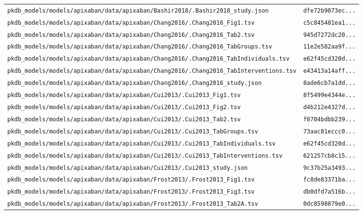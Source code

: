 \documentclass{article}
\begin{document}
\begin{longtable}{ll}
\texttt{pkdb\_models/models/apixaban/data/apixaban/Bashir2018/.Bashir2018\_study.json} & \texttt{dfe72b9073ec...} \\
\texttt{pkdb\_models/models/apixaban/data/apixaban/Chang2016/.Chang2016\_Fig1.tsv} & \texttt{c5c845481ea1...} \\
\texttt{pkdb\_models/models/apixaban/data/apixaban/Chang2016/.Chang2016\_Tab2.tsv} & \texttt{945d7272dc20...} \\
\texttt{pkdb\_models/models/apixaban/data/apixaban/Chang2016/.Chang2016\_TabGroups.tsv} & \texttt{11e2e582aa9f...} \\
\texttt{pkdb\_models/models/apixaban/data/apixaban/Chang2016/.Chang2016\_TabIndividuals.tsv} & \texttt{e62f45cd320d...} \\
\texttt{pkdb\_models/models/apixaban/data/apixaban/Chang2016/.Chang2016\_TabInterventions.tsv} & \texttt{e43413a14aff...} \\
\texttt{pkdb\_models/models/apixaban/data/apixaban/Chang2016/.Chang2016\_study.json} & \texttt{8ade6cb7a1dd...} \\
\texttt{pkdb\_models/models/apixaban/data/apixaban/Cui2013/.Cui2013\_Fig1.tsv} & \texttt{8f5499e4344e...} \\
\texttt{pkdb\_models/models/apixaban/data/apixaban/Cui2013/.Cui2013\_Fig2.tsv} & \texttt{d4b212e4327d...} \\
\texttt{pkdb\_models/models/apixaban/data/apixaban/Cui2013/.Cui2013\_Tab2.tsv} & \texttt{f0704bdbb239...} \\
\texttt{pkdb\_models/models/apixaban/data/apixaban/Cui2013/.Cui2013\_TabGroups.tsv} & \texttt{73aac81eccc0...} \\
\texttt{pkdb\_models/models/apixaban/data/apixaban/Cui2013/.Cui2013\_TabIndividuals.tsv} & \texttt{e62f45cd320d...} \\
\texttt{pkdb\_models/models/apixaban/data/apixaban/Cui2013/.Cui2013\_TabInterventions.tsv} & \texttt{621257cb8c15...} \\
\texttt{pkdb\_models/models/apixaban/data/apixaban/Cui2013/.Cui2013\_study.json} & \texttt{9c37b25a3493...} \\
\texttt{pkdb\_models/models/apixaban/data/apixaban/Frost2013/.Frost2013\_Fig1.tsv} & \texttt{fc8de83371ba...} \\
\texttt{pkdb\_models/models/apixaban/data/apixaban/Frost2013/.Frost2013\_Fig3.tsv} & \texttt{db0dfd7a516b...} \\
\texttt{pkdb\_models/models/apixaban/data/apixaban/Frost2013/.Frost2013\_Tab2A.tsv} & \texttt{0dc8598879e0...} \\

\end{longtable}
\end{document}
